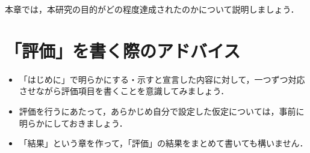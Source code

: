 本章では，本研究の目的がどの程度達成されたのかについて説明しましょう．

\section{「評価」を書く際のアドバイス}
\begin{itemize}
  \item 「はじめに」で明らかにする・示すと宣言した内容に対して，一つずつ対応させながら評価項目を書くことを意識してみましょう．
  \item 評価を行うにあたって，あらかじめ自分で設定した仮定については，事前に明らかにしておきましょう．
  \item 「結果」という章を作って，「評価」の結果をまとめて書いても構いません．
\end{itemize}
